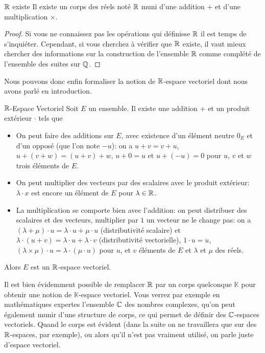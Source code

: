 \documentclass{classe}
\renewcommand*{\K}{\mathbb{K}}
\begin{document}
\begin{théorème}{$\mathbb{R}$ existe}{}
	Il existe un corps des réels noté $\mathbb{R}$ muni d'une addition $+$ et d'une multiplication $\times$.
\end{théorème}
\begin{proof}
	Si vous ne connaissez pas les opérations qui définisse $\mathbb{R}$ il est temps de s'inquiéter. Cependant, si vous cherchez à vérifier que $\mathbb{R}$ existe, il vaut mieux chercher des informations sur la construction de l'ensemble $\mathbb{R}$ comme complété de l'ensemble des suites sur $\mathbb{Q}$.
\end{proof}

Nous pouvons donc enfin formaliser la notion de $\mathbb{R}$-espace vectoriel dont nous avons parlé en introduction.

\begin{définition}{$\mathbb{R}$-Espace Vectoriel}{}
	Soit $E$ un ensemble. Il existe une addition $+$ et un produit extérieur $\cdot$ tels que
	\begin{itemize}
		\item On peut faire des additions sur $E$, avec existence d'un élément neutre $0_E$ et d'un opposé (que l'on note $-u$): on a $u+v = v+u$, $u+(v+w) = (u+v)+w$, $u+0=u$ et $u + (-u) = 0$ pour $u$, $v$ et $w$ trois éléments de $E$.
		\item On peut multiplier des vecteurs par des scalaires avec le produit extérieur: $\lambda\cdot x$ est encore un élément de $E$ pour $\lambda \in \mathbb{R}$.
		\item La multiplication se comporte bien avec l'addition: on peut distribuer des scalaires et des vecteurs, multiplier par $1$ un vecteur ne le change pas: on a $(\lambda + \mu)\cdot u = \lambda\cdot u + \mu\cdot u$ (distributivité scalaire) et $\lambda\cdot (u+v) = \lambda \cdot u+\lambda\cdot v$ (distributivité vectorielle), $1\cdot u = u$, $(\lambda\times\mu)\cdot u = \lambda\cdot (\mu\cdot u)$ pour $u$, et $v$ éléments de $E$ et $\lambda$ et $\mu$ des réels.
	\end{itemize}
	Alors $E$ est un $\mathbb{R}$-espace vectoriel.
\end{définition}

Il est bien évidemment possible de remplacer $\mathbb{R}$ par un corps quelconque $\K$ pour obtenir une notion de $\K$-espace vectoriel.
Vous verrez par exemple en mathématiques expertes l'ensemble $\mathbb{C}$ des nombres complexes, qu'on peut également munir d'une structure de corps, ce qui permet de définir des $\mathbb{C}$-espaces vectoriels.
Quand le corps est évident (dans la suite on ne travaillera que sur des $\mathbb{R}$-espaces, par exemple), ou alors qu'il n'est pas vraiment utilisé, on parle juste d'espace vectoriel.
\end{document}
